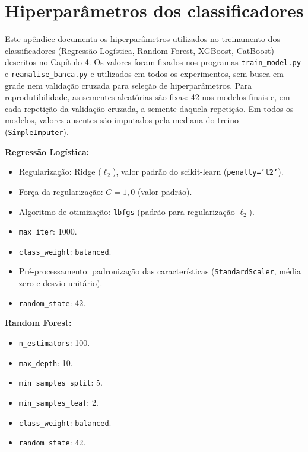 \chapter{Hiperparâmetros dos classificadores}
\label{ap:hiperparametros}

Este apêndice documenta os hiperparâmetros utilizados no treinamento dos classificadores (Regressão Logística, Random Forest, XGBoost, CatBoost) descritos no Capítulo 4. Os valores foram fixados nos programas \texttt{train\_model.py} e \texttt{reanalise\_banca.py} e utilizados em todos os experimentos, sem busca em grade nem validação cruzada para seleção de hiperparâmetros. Para reprodutibilidade, as sementes aleatórias são fixas: 42 nos modelos finais e, em cada repetição da validação cruzada, a semente daquela repetição. Em todos os modelos, valores ausentes são imputados pela mediana do treino (\texttt{SimpleImputer}).

\textbf{Regressão Logística:}
\begin{itemize}
	\item Regularização: Ridge (\(\ell_2\)), valor padrão do scikit-learn (\texttt{penalty='l2'}).
	\item Força da regularização: \(C = 1{,}0\) (valor padrão).
	\item Algoritmo de otimização: \texttt{lbfgs} (padrão para regularização \(\ell_2\)).
	\item \texttt{max\_iter}: 1000.
	\item \texttt{class\_weight}: \texttt{balanced}.
	\item Pré-processamento: padronização das características (\texttt{StandardScaler}, média zero e desvio unitário).
	\item \texttt{random\_state}: 42.
\end{itemize}

\textbf{Random Forest:}
\begin{itemize}
	\item \texttt{n\_estimators}: 100.
	\item \texttt{max\_depth}: 10.
	\item \texttt{min\_samples\_split}: 5.
	\item \texttt{min\_samples\_leaf}: 2.
	\item \texttt{class\_weight}: \texttt{balanced}.
	\item \texttt{random\_state}: 42.
\end{itemize}

